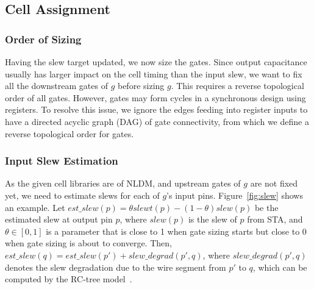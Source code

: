 
\subsection{Cell Assignment}

\subsubsection{Order of Sizing}
\label{sec:sizing_order}

Having the slew target updated, we now size the gates. Since output capacitance usually has larger impact on the cell timing than the input slew, we want to fix all the downstream gates of $g$ before sizing $g$. This requires a reverse topological order of all gates. However, gates may form cycles in a synchronous design using registers. To resolve this issue, we ignore the edges feeding into register inputs to have a directed acyclic graph (DAG) of gate connectivity, from which we define a reverse topological order for gates.

\subsubsection{Input Slew Estimation}
As the given cell libraries are of NLDM, and upstream gates of $g$ are not fixed yet, we need to estimate slews for each of $g$'s input pins. Figure~\ref{fig:slew} shows an example. Let $est\_slew(p) = \theta slewt(p) - (1-\theta)slew(p)$ be the estimated slew at output pin $p$, where $slew(p)$ is the slew of $p$ from STA, and $\theta \in [0,1]$ is a parameter that is close to 1 when gate sizing starts but close to 0 when gate sizing is about to converge. Then, $est\_slew(q) = est\_slew(p') + slew\_degrad(p', q)$, where $slew\_degrad(p', q)$ denotes the slew degradation due to the wire segment from $p'$ to $q$, which can be computed by the RC-tree model~\cite{TAU:Contest}.

